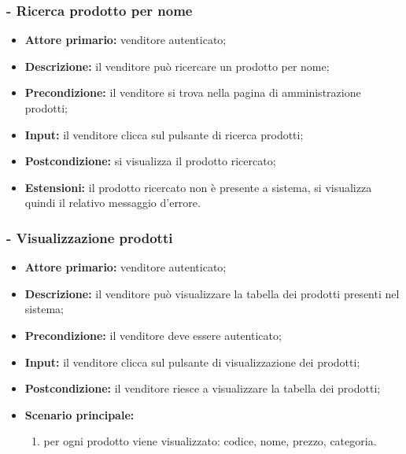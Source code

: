 \subsubsection{- Ricerca prodotto per nome}
\begin{itemize}
    \item \textbf{Attore primario:} venditore autenticato;
    \item \textbf{Descrizione:} il venditore può ricercare un prodotto per nome;
    \item \textbf{Precondizione:} il venditore si trova nella pagina di amministrazione prodotti;
    \item \textbf{Input:} il venditore clicca sul pulsante di ricerca prodotti;
    \item \textbf{Postcondizione:} si visualizza il prodotto ricercato;
    \item \textbf{Estensioni:} il prodotto ricercato non è presente a sistema, si visualizza quindi il relativo messaggio d'errore.
\end{itemize}

\stepsubUserCase
\subsubsection{- Visualizzazione prodotti}
\begin{itemize}
    \item \textbf{Attore primario:} venditore autenticato;
    \item \textbf{Descrizione:} il venditore può visualizzare la tabella dei prodotti presenti nel sistema;
    \item \textbf{Precondizione:} il venditore deve essere autenticato;
    \item \textbf{Input:} il venditore clicca sul pulsante di visualizzazione dei prodotti;
    \item \textbf{Postcondizione:} il venditore riesce a visualizzare la tabella dei prodotti;
    \item \textbf{Scenario principale:}
        \begin{enumerate}
            \item per ogni prodotto viene visualizzato: codice, nome, prezzo, categoria.
        \end{enumerate}
\end{itemize}

\stepUserCase
